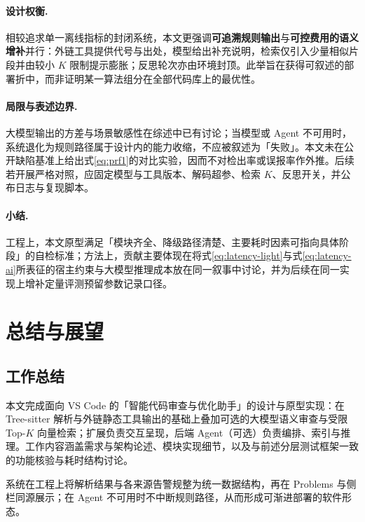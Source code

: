 \paragraph{设计权衡.}
相较追求单一离线指标的封闭系统，本文更强调\textbf{可追溯规则输出}与\textbf{可控费用的语义增补}并行：外链工具提供代号与出处，模型给出补充说明，检索仅引入少量相似片段并由较小 $K$ 限制提示膨胀；反思轮次亦由环境封顶。此举旨在获得可叙述的部署折中，而非证明某一算法组分在全部代码库上的最优性。

\paragraph{局限与表述边界.}
大模型输出的方差与场景敏感性在综述中已有讨论\cite{hou2024llmse,zhang2024surveyllmse}；当模型或 Agent 不可用时，系统退化为规则路径属于设计内的能力收缩，不应被叙述为「失败」。本文未在公开缺陷基准上给出式\eqref{eq:prf1}的对比实验，因而不对检出率或误报率作外推。后续若开展严格对照，应固定模型与工具版本、解码超参、检索 $K$、反思开关，并公布日志与复现脚本。

\paragraph{小结.}
工程上，本文原型满足「模块齐全、降级路径清楚、主要耗时因素可指向具体阶段」的自检标准；方法上，贡献主要体现在将式\eqref{eq:latency-light}与式\eqref{eq:latency-ai}所表征的宿主约束与大模型推理成本放在同一叙事中讨论，并为后续在同一实现上增补定量评测预留参数记录口径。

\newpage

\section{总结与展望}
\subsection{工作总结}
本文完成面向 VS Code 的「智能代码审查与优化助手」的设计与原型实现：在 Tree-sitter 解析与外链静态工具输出的基础上叠加可选的大模型语义审查与受限 Top-$K$ 向量检索\cite{github2025treesitter,sadowski2018scaling,hou2024llmse,lu2023llamareviewer,tufano2021towards,lewis2020retrieval}；扩展负责交互呈现，后端 Agent（可选）负责编排、索引与推理。工作内容涵盖需求与架构论述、模块实现细节，以及与前述分层测试框架一致的功能核验与耗时结构讨论。

系统在工程上将解析结果与各来源告警规整为统一数据结构，再在 Problems 与侧栏同源展示\cite{microsoft2025vscodeapi}；在 Agent 不可用时不中断规则路径，从而形成可渐进部署的软件形态。

